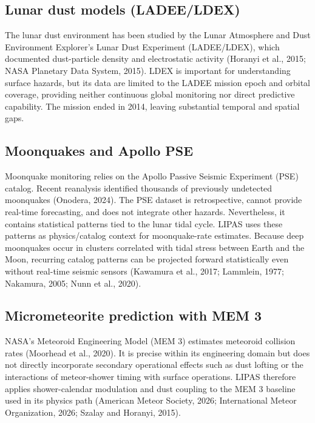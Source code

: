 \subsection{Lunar dust models (LADEE/LDEX)}

The lunar dust environment has been studied by the Lunar Atmosphere and Dust Environment Explorer's Lunar Dust Experiment (LADEE/LDEX), which documented dust-particle density and electrostatic activity (Horanyi et al., 2015; NASA Planetary Data System, 2015). LDEX is important for understanding surface hazards, but its data are limited to the LADEE mission epoch and orbital coverage, providing neither continuous global monitoring nor direct predictive capability. The mission ended in 2014, leaving substantial temporal and spatial gaps.

\subsection{Moonquakes and Apollo PSE}

Moonquake monitoring relies on the Apollo Passive Seismic Experiment (PSE) catalog. Recent reanalysis identified thousands of previously undetected moonquakes (Onodera, 2024). The PSE dataset is retrospective, cannot provide real-time forecasting, and does not integrate other hazards. Nevertheless, it contains statistical patterns tied to the lunar tidal cycle. LIPAS uses these patterns as physics/catalog context for moonquake-rate estimates. Because deep moonquakes occur in clusters correlated with tidal stress between Earth and the Moon, recurring catalog patterns can be projected forward statistically even without real-time seismic sensors (Kawamura et al., 2017; Lammlein, 1977; Nakamura, 2005; Nunn et al., 2020).

\subsection{Micrometeorite prediction with MEM 3}

NASA's Meteoroid Engineering Model (MEM 3) estimates meteoroid collision rates (Moorhead et al., 2020). It is precise within its engineering domain but does not directly incorporate secondary operational effects such as dust lofting or the interactions of meteor-shower timing with surface operations. LIPAS therefore applies shower-calendar modulation and dust coupling to the MEM 3 baseline used in its physics path (American Meteor Society, 2026; International Meteor Organization, 2026; Szalay and Horanyi, 2015).

